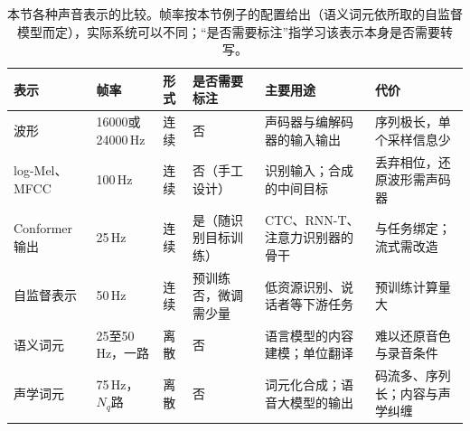 \begin{table}[htbp]
  \centering
  \small
  \begin{tabularx}{\linewidth}{@{}p{26mm}p{20mm}p{14mm}>{\raggedright\arraybackslash}X>{\raggedright\arraybackslash}X>{\raggedright\arraybackslash}X@{}}
    \toprule
    表示 & 帧率 & 形式 & 是否需要标注 & 主要用途 & 代价\\
    \midrule
    波形 & 16000或24000\,Hz & 连续 & 否 & 声码器与编解码器的输入输出 & 序列极长，单个采样信息少\\
    log-Mel、MFCC & 100\,Hz & 连续 & 否（手工设计） & 识别输入；合成的中间目标 & 丢弃相位，还原波形需声码器\\
    Conformer输出 & 25\,Hz & 连续 & 是（随识别目标训练） & CTC、RNN-T、注意力识别器的骨干 & 与任务绑定；流式需改造\\
    自监督表示 & 50\,Hz & 连续 & 预训练否，微调需少量 & 低资源识别、说话者等下游任务 & 预训练计算量大\\
    语义词元 & 25至50\,Hz，一路 & 离散 & 否 & 语言模型的内容建模；单位翻译 & 难以还原音色与录音条件\\
    声学词元 & 75\,Hz，$N_q$路 & 离散 & 否 & 词元化合成；语音大模型的输出 & 码流多、序列长；内容与声学纠缠\\
    \bottomrule
  \end{tabularx}
  \caption{本节各种声音表示的比较。帧率按本节例子的配置给出（语义词元依所取的自监督模型而定），实际系统可以不同；“是否需要标注”指学习该表示本身是否需要转写。}
  \label{tab:nlp-speech-representations}
\end{table}
\FloatBarrier
